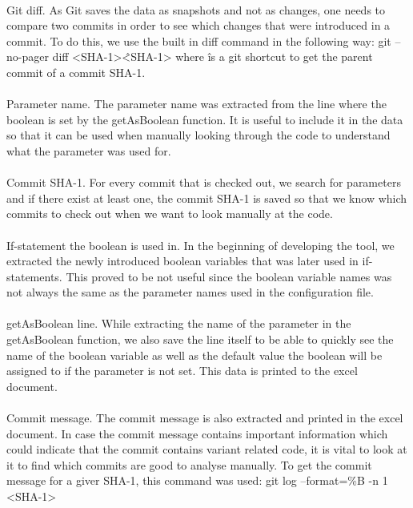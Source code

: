 \paragraph*{}
Git diff. As Git saves the data as snapshots and not as changes, one needs to compare two commits in order to see which changes that were introduced in a commit. To do this, we use the built in diff command in the following way: 
git --no-pager diff <SHA-1>\^ <SHA-1>
where \^ is a git shortcut to get the parent commit of a commit SHA-1.
\paragraph*{}
Parameter name. The parameter name was extracted from the line where the boolean is set by the getAsBoolean function. It is useful to include it in the data so that it can be used when manually looking through the code to understand what the parameter was used for.
\paragraph*{}
Commit SHA-1. For every commit that is checked out, we search for parameters and if there exist at least one, the commit SHA-1 is saved so that we know which commits to check out when we want to look manually at the code.
\paragraph*{}
If-statement the boolean is used in. In the beginning of developing the tool, we extracted the newly introduced boolean variables that was later used in if-statements. This proved to be not useful since the boolean variable names was not always the same as the parameter names used in the configuration file.
\paragraph*{}
getAsBoolean line. While extracting the name of the parameter in the getAsBoolean function, we also save the line itself to be able to quickly see the name of the boolean variable as well as the default value the boolean will be assigned to if the parameter is not set. This data is printed to the excel document.
\paragraph*{}
Commit message. The commit message is also extracted and printed in the excel document. In case the commit message contains important information which could indicate that the commit contains variant related code, it is vital to look at it to find which commits are good to analyse manually.
To get the commit message for a giver SHA-1, this command was used:
git log --format=\%B -n 1 <SHA-1>
